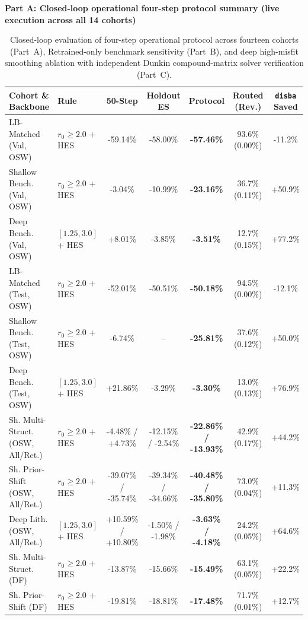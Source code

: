 \begin{table}[width=\textwidth,pos=htbp]
\caption{Closed-loop evaluation of four-step operational protocol across fourteen cohorts (Part~A), Retrained-only benchmark sensitivity (Part~B), and deep high-misfit smoothing ablation with independent Dunkin compound-matrix solver verification (Part~C).}
\label{tab:supp_protocol_retrained_ablation}
\scriptsize
\setlength{\tabcolsep}{1.8pt}
\noindent\textbf{Part A: Closed-loop operational four-step protocol summary (live execution across all 14 cohorts)}\\[2pt]
\begin{tabular*}{\textwidth}{@{\extracolsep{\fill}}llccccc}
\toprule
Cohort \& Backbone & Rule & 50-Step & Holdout ES & Protocol & Routed (Rev.) & \texttt{disba} Saved \\
\midrule
LB-Matched (Val, OSW) & $r_0 \ge 2.0$ + HES & -59.14\% & -58.00\% & \textbf{-57.46\%} & 93.6\% (0.00\%) & -11.2\% \\
Shallow Bench. (Val, OSW) & $r_0 \ge 2.0$ + HES & -3.04\% & -10.99\% & \textbf{-23.16\%} & 36.7\% (0.11\%) & +50.9\% \\
Deep Bench. (Val, OSW) & $[1.25, 3.0]$ + HES & +8.01\% & -3.85\% & \textbf{-3.51\%} & 12.7\% (0.15\%) & +77.2\% \\
\midrule
LB-Matched (Test, OSW) & $r_0 \ge 2.0$ + HES & -52.01\% & -50.51\% & \textbf{-50.18\%} & 94.5\% (0.00\%) & -12.1\% \\
Shallow Bench. (Test, OSW) & $r_0 \ge 2.0$ + HES & -6.74\% & -- & \textbf{-25.81\%} & 37.6\% (0.12\%) & +50.0\% \\
Deep Bench. (Test, OSW) & $[1.25, 3.0]$ + HES & +21.86\% & -3.29\% & \textbf{-3.30\%} & 13.0\% (0.13\%) & +76.9\% \\
\midrule
Sh. Multi-Struct. (OSW, All/Ret.) & $r_0 \ge 2.0$ + HES & -4.48\% / +4.73\% & -12.15\% / -2.54\% & \textbf{-22.86\% / -13.93\%} & 42.9\% (0.17\%) & +44.2\% \\
Sh. Prior-Shift (OSW, All/Ret.) & $r_0 \ge 2.0$ + HES & -39.07\% / -35.74\% & -39.34\% / -34.66\% & \textbf{-40.48\% / -35.80\%} & 73.0\% (0.04\%) & +11.3\% \\
Deep Lith. (OSW, All/Ret.) & $[1.25, 3.0]$ + HES & +10.59\% / +10.80\% & -1.50\% / -1.98\% & \textbf{-3.63\% / -4.18\%} & 24.2\% (0.05\%) & +64.6\% \\
Sh. Multi-Struct. (DF) & $r_0 \ge 2.0$ + HES & -13.87\% & -15.66\% & \textbf{-15.49\%} & 63.1\% (0.05\%) & +22.2\% \\
Sh. Prior-Shift (DF) & $r_0 \ge 2.0$ + HES & -19.81\% & -18.81\% & \textbf{-17.48\%} & 71.7\% (0.01\%) & +12.7\% \\

\end{tabular*}
\end{table}
